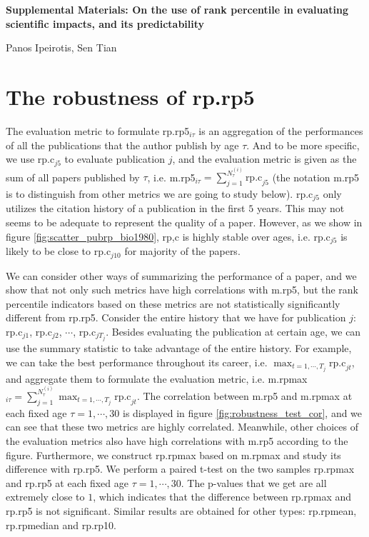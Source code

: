 \clearpage
\begin{refsection}
\beginsupplement
\appendix
{}
\begin{center}
\textbf{\large Supplemental Materials: On the use of rank percentile in evaluating scientific impacts, and its predictability}

Panos Ipeirotis, Sen Tian
\end{center}

\section{The robustness of rp.rp5}
\label{sec:robustness_rprp}
The evaluation metric to formulate rp.rp5$_{i\tau}$ is an aggregation of the performances of all the publications that the author publish by age $\tau$. And to be more specific, we use rp.c$_{j5}$ to evaluate publication $j$, and the evaluation metric is given as the sum of all papers published by $\tau$, i.e. m.rp5$_{i\tau} = \sum_{j=1}^{N_\tau^{(i)}} \text{rp.c}_{j5}$ (the notation m.rp5 is to distinguish from other metrics we are going to study below). rp.c$_{j5}$ only utilizes the citation history of a publication in the first $5$ years. This may not seems to be adequate to represent the quality of a paper. However, as we show in figure \ref{fig:scatter_pubrp_bio1980}, rp,c is highly stable over ages, i.e. rp.c$_{j5}$ is likely to be close to rp.c$_{j10}$ for majority of the papers. 

We can consider other ways of summarizing the performance of a paper, and we show that not only such metrics have high correlations with m.rp5, but the rank percentile indicators based on these metrics are not statistically significantly different from rp.rp5. Consider the entire history that we have for publication $j$: rp.c$_{j1}$, rp.c$_{j2}$, $\cdots$, rp.c$_{j T_j}$. Besides evaluating the publication at certain age, we can use the summary statistic to take advantage of the entire history. For example, we can take the best performance throughout its career, i.e. $\displaystyle \max_{t=1,\cdots,T_j} \text{rp.c}_{jt}$, and aggregate them to formulate the evaluation metric, i.e. m.rpmax$_{i\tau} = \displaystyle \sum_{j=1}^{N_\tau^{(i)}} \max_{t=1,\cdots,T_j} \text{rp.c}_{jt}$. The correlation between m.rp5 and m.rpmax at each fixed age $\tau=1,\cdots,30$ is displayed in figure \ref{fig:robustness_test_cor}, and we can see that these two metrics are highly correlated. Meanwhile, other choices of the evaluation metrics also have high correlations with m.rp5 according to the figure. Furthermore, we construct rp.rpmax based on m.rpmax and study its difference with rp.rp5. We perform a paired t-test on the two samples rp.rpmax and rp.rp5 at each fixed age $\tau=1,\cdots,30$. The p-values that we get are all extremely close to $1$, which indicates that the difference between rp.rpmax and rp.rp5 is not significant. Similar results are obtained for other types: rp.rpmean, rp.rpmedian and rp.rp10. 



\end{refsection}
